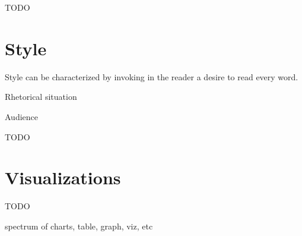 \documentclass[10pt,a4paper]{book}
\begin{document}
\color{BrickRed}TODO\color{black}


\chapter{Style}\label{Style}


Style can be characterized by invoking in the reader a desire to read every word.

Rhetorical situation

Audience

\color{BrickRed}TODO\color{black}


\chapter{Visualizations}\label{Visualizations}

\color{BrickRed}TODO\color{black}

spectrum of charts, table, graph, viz, etc




\end{document}
